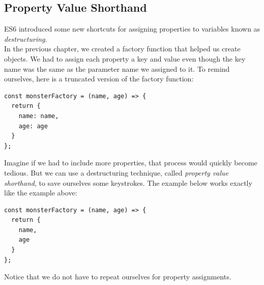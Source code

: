 \documentclass[11pt]{article}
\begin{document}
\subsection{Property Value Shorthand}
ES6 introduced some new shortcuts for assigning properties to variables known as \textit{destructuring}. \\
\newline
In the previous chapter, we created a factory function that helped us create objects. We had to assign each property a key and value even though the key name was the same as the parameter name we assigned to it. To remind ourselves, here is a truncated version of the factory function:
\begin{lstlisting}
const monsterFactory = (name, age) => {
  return { 
    name: name,
    age: age
  }
};
\end{lstlisting}
Imagine if we had to include more properties, that process would quickly become tedious. But we can use a destructuring technique, called \textit{property value shorthand}, to save ourselves some keystrokes. The example below works exactly like the example above: 
\begin{lstlisting}
const monsterFactory = (name, age) => {
  return { 
    name,
    age 
  }
};
\end{lstlisting}
Notice that we do not have to repeat ourselves for property assignments. 
\end{document}
